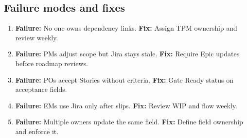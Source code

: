 \subsection{Failure modes and fixes}
\begin{enumerate}
  \item \textbf{Failure:} No one owns dependency links. \textbf{Fix:} Assign TPM ownership and review weekly.
  \item \textbf{Failure:} PMs adjust scope but Jira stays stale. \textbf{Fix:} Require Epic updates before roadmap reviews.
  \item \textbf{Failure:} POs accept Stories without criteria. \textbf{Fix:} Gate Ready status on acceptance fields.
  \item \textbf{Failure:} EMs use Jira only after slips. \textbf{Fix:} Review WIP and flow weekly.
  \item \textbf{Failure:} Multiple owners update the same field. \textbf{Fix:} Define field ownership and enforce it.
\end{enumerate}










